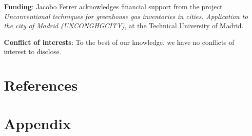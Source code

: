 \documentclass[
  10pt,
  twocolumn]{aft}
\begin{document}
\textbf{Funding}: Jacobo Ferrer acknowledges financial support from the
project \emph{Unconventional techniques for greenhouse gas inventories
in cities. Application to the city of Madrid (UNCONGHGCITY)}, at the
Technical University of Madrid.

\textbf{Conflict of interests}: To the best of our knowledge, we have no
conflicts of interest to disclose.

\newpage

\section*{References}\label{references}

\renewcommand{\bibsection}{}


\newpage

\section*{Appendix}\label{appendix}
\end{document}
